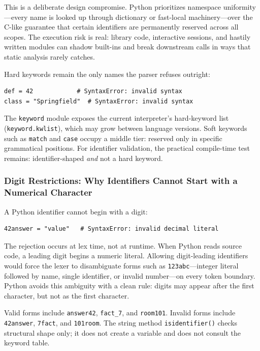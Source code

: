 This is a deliberate design compromise. Python prioritizes namespace uniformity---every name is looked up through dictionary or fast-local machinery---over the C-like guarantee that certain identifiers are permanently reserved across all scopes. The execution risk is real: library code, interactive sessions, and hastily written modules can shadow built-ins and break downstream calls in ways that static analysis rarely catches.

Hard keywords remain the only names the parser refuses outright:

\begin{verbatim}
def = 42            # SyntaxError: invalid syntax
class = "Springfield"  # SyntaxError: invalid syntax
\end{verbatim}

The \texttt{keyword} module exposes the current interpreter's hard-keyword list (\texttt{keyword.kwlist}), which may grow between language versions. Soft keywords such as \texttt{match} and \texttt{case} occupy a middle tier: reserved only in specific grammatical positions. For identifier validation, the practical compile-time test remains: identifier-shaped \emph{and} not a hard keyword.

\subsubsection{Digit Restrictions: Why Identifiers Cannot Start with a Numerical Character}

A Python identifier cannot begin with a digit:

\begin{verbatim}
42answer = "value"   # SyntaxError: invalid decimal literal
\end{verbatim}

The rejection occurs at lex time, not at runtime. When Python reads source code, a leading digit begins a numeric literal. Allowing digit-leading identifiers would force the lexer to disambiguate forms such as \texttt{123abc}---integer literal followed by name, single identifier, or invalid number---on every token boundary. Python avoids this ambiguity with a clean rule: digits may appear after the first character, but not as the first character.

Valid forms include \texttt{answer42}, \texttt{fact\_7}, and \texttt{room101}. Invalid forms include \texttt{42answer}, \texttt{7fact}, and \texttt{101room}. The string method \texttt{isidentifier()} checks structural shape only; it does not create a variable and does not consult the keyword table.

